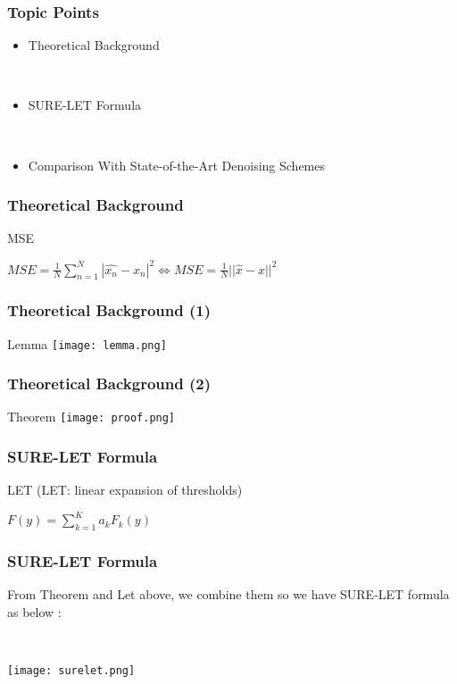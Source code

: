 \documentclass{beamer}
\begin{document}
	
	\begin{frame}
		\frametitle{Topic Points}
		\begin{itemize}
			\item  Theoretical Background
		
		\
		
			\item SURE-LET Formula 
			
			\
			
			\item Comparison With State-of-the-Art Denoising Schemes

		
		\end{itemize}
	\end{frame}
	
	
	\begin{frame}
		\frametitle{Theoretical Background}
\begin{block}{MSE}

$MSE=\frac{1}{N}\displaystyle\sum_{n=1}^{N}|\hat{x_n}-x_n|^2 \Leftrightarrow MSE=\frac{1}{N}||\hat{x}-x||^2$ 
	\end{block}


	\end{frame}
	
	\begin{frame}
			\frametitle{Theoretical Background (1)}
	\begin{block}{Lemma}
		\texttt{[image: lemma.png]}
	\end{block}

\end{frame}
\begin{frame}
	\frametitle{Theoretical Background (2)}
	\begin{block}{Theorem}
	\texttt{[image: proof.png]}	
	\end{block}
\end{frame}	
\begin{frame}
	\frametitle{SURE-LET Formula }
\begin{block}{LET}
(LET: linear expansion of thresholds)

$F(y)=\displaystyle\sum_{k=1}^{K}a_kF_k(y) $
\end{block}


\end{frame}	
	\begin{frame}
		\frametitle{SURE-LET Formula}
		From Theorem and Let above, we combine them so we have SURE-LET formula as below : 	
		
		\

\texttt{[image: surelet.png]}	
\end{frame}	
	
\end{document}
